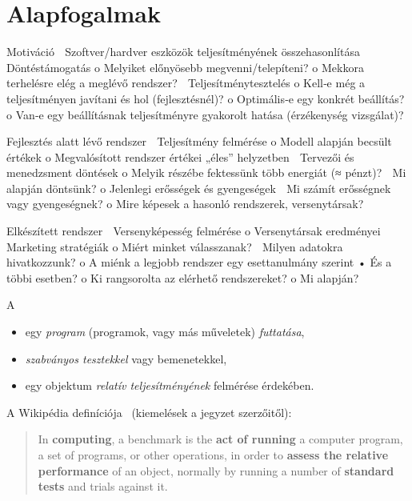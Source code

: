 \label{cha:benchmarking}

\graphicspath{ {./benchmarking/figures/} }


\section{Alapfogalmak}

Motiváció
 Szoftver/hardver eszközök teljesítményének 
összehasonlítása
 Döntéstámogatás 
o Melyiket előnyösebb megvenni/telepíteni?
o Mekkora terhelésre elég a meglévő rendszer?
 Teljesítménytesztelés 
o Kell‐e még a teljesítményen javítani és hol 
(fejlesztésnél)?
o Optimális‐e egy konkrét beállítás?
o Van‐e egy beállításnak teljesítményre gyakorolt hatása 
(érzékenység vizsgálat)?

Fejlesztés alatt lévő rendszer
 Teljesítmény felmérése
o Modell alapján becsült értékek
o Megvalósított rendszer értékei „éles” helyzetben
 Tervezői és menedzsment döntések
o Melyik részébe fektessünk több energiát (≈ pénzt)? 
 Mi alapján döntsünk?
o Jelenlegi erősségek és gyengeségek
 Mi számít erősségnek vagy gyengeségnek?
o Mire képesek a hasonló rendszerek, versenytársak?

Elkészített rendszer
 Versenyképesség felmérése
o Versenytársak eredményei
 Marketing stratégiák
o Miért minket válasszanak?
 Milyen adatokra hivatkozzunk?
o A miénk a legjobb rendszer egy esettanulmány szerint
• És a többi esetben?
o Ki rangsorolta az elérhető rendszereket?
o Mi alapján?

\begin{definicio}
	A 
	\begin{itemize}
		\item egy \emph{program} (programok, vagy más műveletek) \emph{futtatása},
		\item \emph{szabványos tesztekkel} vagy bemenetekkel,
		\item egy objektum \emph{relatív teljesítményének} felmérése érdekében.
	\end{itemize}
\end{definicio}

A Wikipédia definíciója~\cite{wiki:benchmark} (kiemelések a jegyzet szerzőitől):

\begin{quote}
	In \textbf{computing}, a benchmark is the \textbf{act of running} a computer program, a set of programs, or other operations, in order to \textbf{assess the relative performance} of an object, normally by running a number of \textbf{standard tests} and trials against it.
\end{quote}

